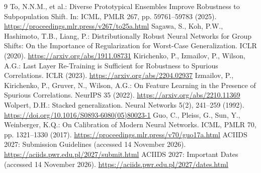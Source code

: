 \documentclass[runningheads]{llncs}
\begin{document}
\begin{thebibliography}{9}
 To, N.N.M., et al.: Diverse Prototypical Ensembles Improve Robustness to Subpopulation Shift. In: ICML, PMLR 267, pp. 59761--59783 (2025). \url{https://proceedings.mlr.press/v267/to25a.html}
 Sagawa, S., Koh, P.W., Hashimoto, T.B., Liang, P.: Distributionally Robust Neural Networks for Group Shifts: On the Importance of Regularization for Worst-Case Generalization. ICLR (2020). \url{https://arxiv.org/abs/1911.08731}
 Kirichenko, P., Izmailov, P., Wilson, A.G.: Last Layer Re-Training is Sufficient for Robustness to Spurious Correlations. ICLR (2023). \url{https://arxiv.org/abs/2204.02937}
 Izmailov, P., Kirichenko, P., Gruver, N., Wilson, A.G.: On Feature Learning in the Presence of Spurious Correlations. NeurIPS 35 (2022). \url{https://arxiv.org/abs/2210.11369}
 Wolpert, D.H.: Stacked generalization. Neural Networks 5(2), 241--259 (1992). \url{https://doi.org/10.1016/S0893-6080(05)80023-1}
 Guo, C., Pleiss, G., Sun, Y., Weinberger, K.Q.: On Calibration of Modern Neural Networks. ICML, PMLR 70, pp. 1321--1330 (2017). \url{https://proceedings.mlr.press/v70/guo17a.html}
 ACIIDS 2027: Submission Guidelines (accessed 14 November 2026). \url{https://aciids.pwr.edu.pl/2027/submit.html}
 ACIIDS 2027: Important Dates (accessed 14 November 2026). \url{https://aciids.pwr.edu.pl/2027/dates.html}
\end{thebibliography}
\end{document}
